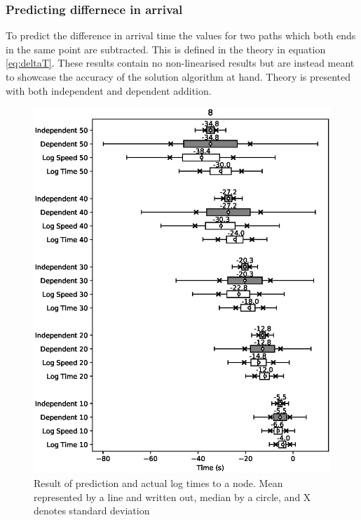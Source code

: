 \documentclass{article}
\begin{document}
			\subsubsection{Predicting differnece in arrival}

				To predict the difference in arrival time the values for two paths which both ends in the same point are subtracted. This is defined in the theory in equation \ref{eq:deltaT}. These results contain no non-linearised results but are instead meant to showcase the accuracy of the solution algorithm at hand. Theory is presented with both independent and dependent addition.

				\begin{figure}[H]
					\includegraphics[scale=0.7]{8.eps}
					\caption{Result of prediction and actual log times to a node. Mean represented by a line and written out, median by a circle, and X denotes standard deviation}
					\label{fig:box1}
				\end{figure}
\end{document}
